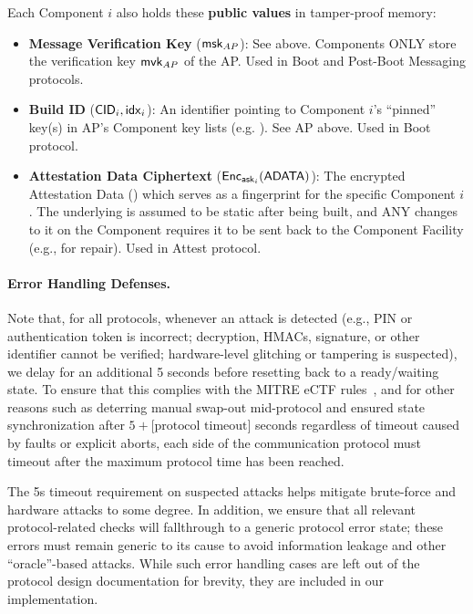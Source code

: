 \vspace{1em}
Each Component $i$ also holds these \textbf{public values} in tamper-proof memory:
\begin{itemize}
    \item \textbf{Message Verification Key} ($\mathsf{msk}_{AP}$): See above. Components ONLY store the verification key $\mathsf{mvk}_{AP}$ of the AP. Used in Boot and Post-Boot Messaging protocols.
    \item \textbf{Build ID} ($\mathsf{CID}_i, \mathsf{idx}_i$): An identifier pointing to Component $i$'s ``pinned'' key(s) in AP's Component key lists (e.g. \mvklist). See AP above. Used in Boot protocol.
    \item \textbf{Attestation Data Ciphertext} ($\mathsf{Enc}_{\mathsf{ask}_i}(\mathsf{ADATA})$): The encrypted Attestation Data (\adata) which serves as a fingerprint for the specific Component $i$. The underlying \adata is assumed to be static after being built, and ANY changes to it on the Component requires it to be sent back to the Component Facility (e.g., for repair). Used in Attest protocol.
\end{itemize}
\fi

\paragraph{Error Handling Defenses.} Note that, for all protocols, whenever an attack is detected (e.g., PIN or authentication token is incorrect; decryption, HMACs, signature, or other identifier cannot be verified; hardware-level glitching or tampering is suspected), we delay for an additional 5 seconds before resetting back to a ready/waiting state. To ensure that this complies with the MITRE eCTF rules~\cite{eCTFOfficial}, and for other reasons \iflong such as deterring manual swap-out mid-protocol and ensured state synchronization after $5 + \text{[protocol timeout]}$ seconds regardless of timeout caused by faults or explicit aborts\fi, each side of the communication protocol must timeout after the maximum protocol time has been reached.

The 5s timeout requirement on suspected attacks helps mitigate brute-force and hardware attacks to some degree. In addition, we ensure that all relevant protocol-related checks will fallthrough to a generic protocol error state\iflong; these errors must remain generic to its cause to avoid information leakage and other ``oracle''-based attacks\fi. While such error handling cases are left out of the protocol design documentation for brevity, they are included in our implementation.




